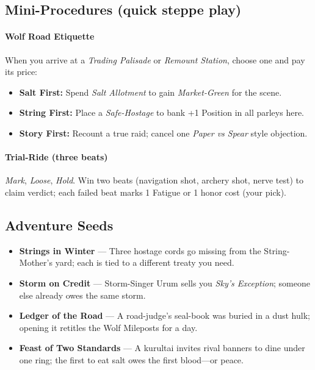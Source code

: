 \subsection*{Mini-Procedures (quick steppe play)}
\paragraph{Wolf Road Etiquette}
When you arrive at a \emph{Trading Palisade} or \emph{Remount Station}, choose one and pay its price:
\begin{itemize}
  \item \textbf{Salt First:} Spend \emph{Salt Allotment} to gain \emph{Market-Green} for the scene.
  \item \textbf{String First:} Place a \emph{Safe-Hostage} to bank +1 Position in all parleys here.
  \item \textbf{Story First:} Recount a true raid; cancel one \emph{Paper vs Spear} style objection.
\end{itemize}

\paragraph{Trial-Ride (three beats)}
\emph{Mark}, \emph{Loose}, \emph{Hold}.  
Win two beats (navigation shot, archery shot, nerve test) to claim verdict; each failed beat marks 1 Fatigue or 1 honor cost (your pick).

\subsection*{Adventure Seeds}
\begin{itemize}
  \item \textbf{Strings in Winter} — Three hostage cords go missing from the String-Mother’s yard; each is tied to a different treaty you need.
  \item \textbf{Storm on Credit} — Storm-Singer Urum sells you \emph{Sky’s Exception}; someone else already owes the same storm.
  \item \textbf{Ledger of the Road} — A road-judge’s seal-book was buried in a dust hulk; opening it retitles the Wolf Mileposts for a day.
  \item \textbf{Feast of Two Standards} — A kurultai invites rival banners to dine under one ring; the first to eat salt owes the first blood—or peace.
\end{itemize}
